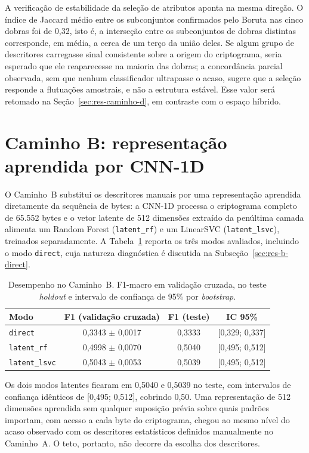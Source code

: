 A verificação de estabilidade da seleção de atributos aponta na mesma direção. O índice de Jaccard médio entre os subconjuntos confirmados pelo Boruta nas cinco dobras foi de 0,32, isto é, a interseção entre os subconjuntos de dobras distintas corresponde, em média, a cerca de um terço da união deles. Se algum grupo de descritores carregasse sinal consistente sobre a origem do criptograma, seria esperado que ele reaparecesse na maioria das dobras; a concordância parcial observada, sem que nenhum classificador ultrapasse o acaso, sugere que a seleção responde a flutuações amostrais, e não a estrutura estável. Esse valor será retomado na Seção~\ref{sec:res-caminho-d}, em contraste com o espaço híbrido.

\section{Caminho B: representação aprendida por CNN-1D}
\label{sec:res-caminho-b}

O Caminho~B substitui os descritores manuais por uma representação aprendida diretamente da sequência de bytes: a CNN-1D processa o criptograma completo de 65.552 bytes e o vetor latente de 512 dimensões extraído da penúltima camada alimenta um Random Forest (\texttt{latent\_rf}) e um LinearSVC (\texttt{latent\_lsvc}), treinados separadamente. A Tabela~\ref{tab:res-b} reporta os três modos avaliados, incluindo o modo \texttt{direct}, cuja natureza diagnóstica é discutida na Subseção~\ref{sec:res-b-direct}.

\begin{table}[htb]
\centering
\caption{Desempenho no Caminho~B. F1-macro em validação cruzada, no teste \textit{holdout} e intervalo de confiança de 95\% por \textit{bootstrap}.}
\label{tab:res-b}
\begin{tabular}{lccc}
\toprule
Modo & F1 (validação cruzada) & F1 (teste) & IC 95\% \\
\midrule
\texttt{direct}       & 0,3343 $\pm$ 0,0017 & 0,3333 & [0,329; 0,337] \\
\texttt{latent\_rf}   & 0,4998 $\pm$ 0,0070 & 0,5040 & [0,495; 0,512] \\
\texttt{latent\_lsvc} & 0,5043 $\pm$ 0,0053 & 0,5039 & [0,495; 0,512] \\
\bottomrule
\end{tabular}
\end{table}

Os dois modos latentes ficaram em 0,5040 e 0,5039 no teste, com intervalos de confiança idênticos de [0,495; 0,512], cobrindo 0,50. Uma representação de 512 dimensões aprendida sem qualquer suposição prévia sobre quais padrões importam, com acesso a cada byte do criptograma, chegou ao mesmo nível do acaso observado com os descritores estatísticos definidos manualmente no Caminho~A. O teto, portanto, não decorre da escolha dos descritores.

